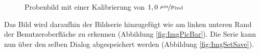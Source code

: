 \documentclass[
fontsize=10pt, 
listof = totoc,
parskip = half	
]{report}
\begin{document}
\begin{figure}[H]
	\centering
	\caption{Probenbild mit einer Kalibrierung von $1,0~\nicefrac{\mu m}{\text{Pixel}}$}
	\label{fig:ImgAddToSet}
\end{figure}

\noindent Das Bild wird daraufhin der Bildserie hinzugefügt wie am linken unteren Rand der Benutzeroberfläche zu erkennen (Abbildung \ref{fig:ImgPicBar}). Die Serie kann nun über den selben Dialog abgespeichert werden (Abbildung \ref{fig:ImgSetSave}).
\end{document}
